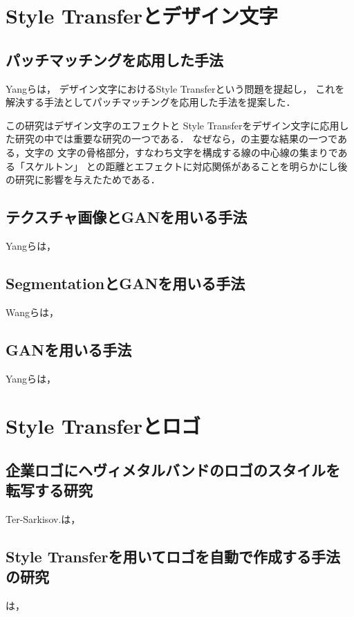 \documentclass[\homedir/main.tex]{subfiles}
\begin{document}
\section{Style Transferとデザイン文字}\label{sec:text_effects_transfer}
\subsection{パッチマッチングを応用した手法}%
Yangら\cite{Yang_2017_CVPR}は，
デザイン文字におけるStyle Transferという問題を提起し，
これを解決する手法としてパッチマッチングを応用した手法を提案した．

この研究はデザイン文字のエフェクトと
Style Transferをデザイン文字に応用した研究の中では重要な研究の一つである．
なぜなら，\cite{Yang_2017_CVPR}の主要な結果の一つである，文字の
文字の骨格部分，すなわち文字を構成する線の中心線の集まりである「スケルトン」
との距離とエフェクトに対応関係があることを明らかにし後の研究に影響を与えたためである．


\subsection{テクスチャ画像とGANを用いる手法}%
Yangら\cite{Yang2019Controllable}は，

\subsection{SegmentationとGANを用いる手法}%
Wangら\cite{typography2019}は，

\subsection{GANを用いる手法}%
Yangら\cite{Yang2019TETGAN}は，

\section{Style Transferとロゴ}\label{sec:logo_style_transfer}%
\subsection{企業ロゴにヘヴィメタルバンドのロゴのスタイルを転写する研究}
Ter-Sarkisov.\cite{icpram20}は，

\subsection{Style Transferを用いてロゴを自動で作成する手法の研究}%
\citeauthor{oai:irdb.nii.ac.jp:01211:0005350653}\cite{oai:irdb.nii.ac.jp:01211:0005350653}は，
\end{document}
